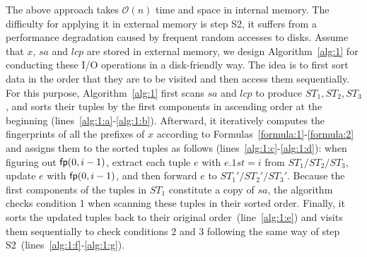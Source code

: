 \documentclass[10pt,journal,compsoc]{IEEEtran}
\begin{document}
The above approach takes $\mathcal{O}(n)$ time and space in internal memory. The difficulty for applying it in external memory is step S2, it suffers from a performance degradation caused by frequent random accesses to disks. Assume that $x$, $sa$ and $lcp$ are stored in external memory, we design Algorithm~\ref{alg:1} for conducting these I/O operations in a disk-friendly way. The idea is to first sort data in the order that they are to be visited and then access them sequentially. For this purpose, Algorithm~\ref{alg:1} first scans $sa$ and $lcp$ to produce $ST_1, ST_2, ST_3$, and sorts their tuples by the first components in ascending order at the beginning (lines~\ref{alg:1:a}-\ref{alg:1:b}). Afterward, it iteratively computes the fingerprints of all the prefixes of $x$ according to Formulas~\ref{formula:1}-\ref{formula:2} and assigns them to the sorted tuples as follows (lines~\ref{alg:1:c}-\ref{alg:1:d}): when figuring out ${\sf fp}(0, i - 1)$, extract each tuple $e$ with $e.1st = i$ from $ST_1/ST_2/ST_3$, update $e$  with ${\sf fp}(0, i - 1)$, and then forward $e$ to $ST_1'/ST_2'/ST_3'$. Because the first components of the tuples in $ST_1$ constitute a copy of $sa$, the algorithm checks condition 1 when scanning these tuples in their sorted order. Finally, it sorts the updated tuples back to their original order~(line~\ref{alg:1:e}) and visits them sequentially to check conditions 2 and 3 following the same way of step S2~(lines~\ref{alg:1:f}-\ref{alg:1:g}).  



\end{document}
